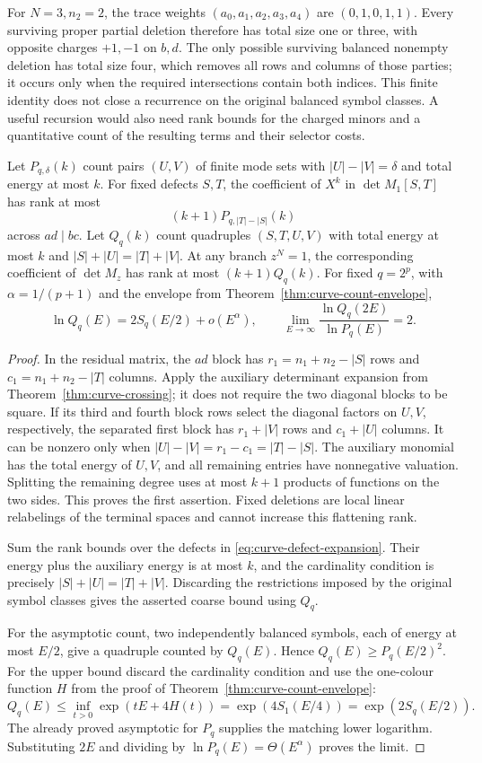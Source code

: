 For $N=3,n_2=2$, the trace weights $(a_0,a_1,a_2,a_3,a_4)$ are $(0,1,0,1,1)$. Every surviving proper partial deletion therefore has total size one or three, with opposite charges $+1,-1$ on $b,d$. The only possible surviving balanced nonempty deletion has total size four, which removes all rows and columns of those parties; it occurs only when the required intersections contain both indices. This finite identity does not close a recurrence on the original balanced symbol classes. A useful recursion would also need rank bounds for the charged minors and a quantitative count of the resulting terms and their selector costs.

\begin{proposition}\label{prop:charged-minors}
Let $P_{q,\delta}(k)$ count pairs $(U,V)$ of finite mode sets with $|U|-|V|=\delta$ and total energy at most $k$. For fixed defects $S,T$, the coefficient of $X^k$ in $\det M_1[S,T]$ has rank at most
\[
 (k+1)P_{q,|T|-|S|}(k)
\]
across $ad\mid bc$. Let $Q_q(k)$ count quadruples $(S,T,U,V)$ with total energy at most $k$ and $|S|+|U|=|T|+|V|$. At any branch $z^N=1$, the corresponding coefficient of $\det M_z$ has rank at most $(k+1)Q_q(k)$. For fixed $q=2^p$, with $\alpha=1/(p+1)$ and the envelope from Theorem~\ref{thm:curve-count-envelope},
\[
 \ln Q_q(E)=2S_q(E/2)+o(E^\alpha),\qquad
 \lim_{E\to\infty}\frac{\ln Q_q(2E)}{\ln P_q(E)}=2.
\]
\end{proposition}
\begin{proof}
In the residual matrix, the $ad$ block has $r_1=n_1+n_2-|S|$ rows and $c_1=n_1+n_2-|T|$ columns. Apply the auxiliary determinant expansion from Theorem~\ref{thm:curve-crossing}; it does not require the two diagonal blocks to be square. If its third and fourth block rows select the diagonal factors on $U,V$, respectively, the separated first block has $r_1+|V|$ rows and $c_1+|U|$ columns. It can be nonzero only when
$|U|-|V|=r_1-c_1=|T|-|S|$.
The auxiliary monomial has the total energy of $U,V$, and all remaining entries have nonnegative valuation. Splitting the remaining degree uses at most $k+1$ products of functions on the two sides. This proves the first assertion. Fixed deletions are local linear relabelings of the terminal spaces and cannot increase this flattening rank.

Sum the rank bounds over the defects in \eqref{eq:curve-defect-expansion}. Their energy plus the auxiliary energy is at most $k$, and the cardinality condition is precisely $|S|+|U|=|T|+|V|$. Discarding the restrictions imposed by the original symbol classes gives the asserted coarse bound using $Q_q$.

For the asymptotic count, two independently balanced symbols, each of energy at most $E/2$, give a quadruple counted by $Q_q(E)$. Hence
$Q_q(E)\geq P_q(E/2)^2$.
For the upper bound discard the cardinality condition and use the one-colour function $H$ from the proof of Theorem~\ref{thm:curve-count-envelope}:
\[
 Q_q(E)\leq\inf_{t>0}\exp(tE+4H(t))
 =\exp(4S_1(E/4))=\exp(2S_q(E/2)).
\]
The already proved asymptotic for $P_q$ supplies the matching lower logarithm. Substituting $2E$ and dividing by $\ln P_q(E)=\Theta(E^\alpha)$ proves the limit.
\end{proof}

